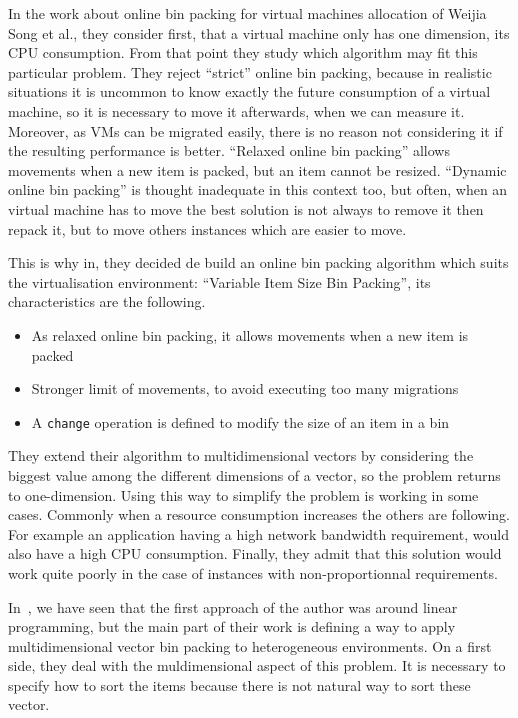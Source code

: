 \documentclass[a4paper,11pt]{article}
\begin{document}
In the work about online bin packing for virtual machines allocation of Weijia
Song et al.\cite{reassignment:visbp}, they consider first, that a virtual
machine only has one dimension, its CPU consumption. From that point they study
which algorithm may fit this particular problem. They reject “strict” online
bin packing, because in realistic situations it is uncommon to know exactly
the future consumption of a virtual machine, so it is necessary to move it
afterwards, when we can measure it. Moreover, as VMs can be migrated easily,
there is no reason not considering it if the resulting performance is better.
“Relaxed online bin packing” allows movements when a new item is packed, but
an item cannot be resized. “Dynamic online bin packing” is thought inadequate
in this context too, but often, when an virtual machine has to move the best
solution is not always to remove it then repack it, but to move others instances
which are easier to move.

This is why in\cite{reassignment:visbp}, they decided de build an online bin
packing algorithm which suits the virtualisation environment: “Variable Item
Size Bin Packing”, its characteristics are the following.

\begin{itemize}
	\item{As relaxed online bin packing, it allows movements when a new item is packed}
	\item{Stronger limit of movements, to avoid executing too many migrations}
	\item{A \texttt{change} operation is defined to modify the size of an item in a bin}
\end{itemize}

They extend their algorithm to multidimensional vectors by considering the biggest
value among the different dimensions of a vector, so the problem returns to
one-dimension. Using this way to simplify the problem is working in some cases.
Commonly when a resource consumption increases the others are following. For
example an application having a high network bandwidth requirement, would also have a
high CPU consumption. Finally, they admit that this solution would work quite poorly
in the case of instances with non-proportionnal requirements.

In~\cite{allocation:heterogeneous}, we have seen that the first approach of the author
was around linear programming, but the main part of their work is defining a way
to apply multidimensional vector bin packing to heterogeneous environments. On a first side,
they deal with the muldimensional aspect of this problem. It is necessary to specify how to
sort the items because there is not natural way to sort these vector.
\end{document}
